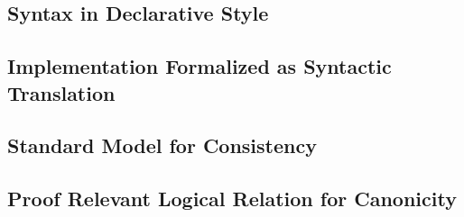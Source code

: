 







\subsection{Syntax in Declarative Style}





\subsection{Implementation Formalized as Syntactic Translation}



\subsection{Standard Model for Consistency}




\subsection{Proof Relevant Logical Relation for Canonicity}

